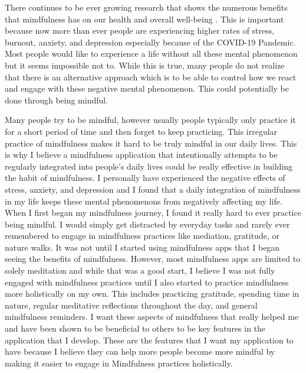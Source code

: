 \documentclass[12pt,twocolumn]{article}
\begin{document}
There continues to be ever growing research that shows the numerous benefits that mindfulness has on our health and overall well-being . This is important because now more than ever people are experiencing higher rates of stress, burnout, anxiety, and depression especially because of the COVID-19 Pandemic. Most people would like to experience a life without all these mental phenomenon but it seems impossible not to. While this is true, many people do not realize that there is an alternative approach which is to be able to control how we react and engage with these negative mental phenomenon. This could potentially be done through being mindful. 

Many people try to be mindful, however usually people typically only practice it for a short period of time and then forget to keep practicing. This irregular practice of mindfulness makes it hard to be truly mindful in our daily lives. This is why I believe a mindfulness application that intentionally attempts to be regularly integrated into people's daily lives could be really effective in building the habit of mindfulness. I personally have experienced the negative effects of stress, anxiety, and depression and I found that a  daily integration of mindfulness in my life keeps these mental phenomenons from negatively affecting my life. When I first began my mindfulness journey, I found it really hard to ever practice being mindful. I would simply get distracted by everyday tasks and rarely ever remembered to engage in mindfulness practices like mediation, gratitude, or nature walks. It was not until I started using mindfulness apps that I began seeing the benefits of mindfulness. However, most mindfulness apps are limited to solely meditation and while that was a good start, I believe I was not fully engaged with mindfulness practices until I also started to practice mindfulness more holistically on my own. This includes practicing gratitude, spending time in nature, regular meditative reflections throughout the day, and general mindfulness reminders. I want these aspects of mindfulness that really helped me and have been shown to be beneficial to others to be key features in the application that I develop. These are the features that I want my application to have because I believe they can help more people become more mindful by making it easier to engage in Mindfulness practices holistically. 
\end{document}
